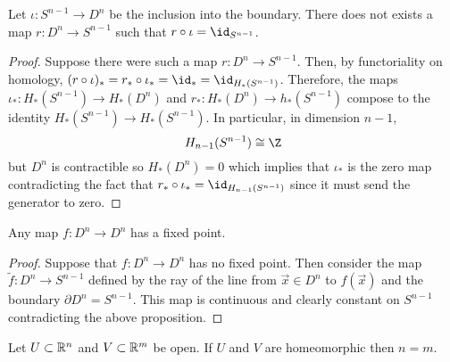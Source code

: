 \documentclass[12pt]{extarticle}
\begin{document}
\begin{proposition}
Let $\iota : S^{n-1} \to D^n$ be the inclusion into the boundary. There does not exists a map $r : D^n \to S^{n-1}$ such that $r \circ \iota = \id_{S^{n-1}}$. 
\end{proposition}

\begin{proof}
Suppose there were such a map $r : D^n \to S^{n-1}$. Then, by functoriality on homology, $(r \circ \iota)_* = r_* \circ \iota_* = \id_* = \id_{H_*(S^{n-1})}$. 
Therefore, the maps $\iota_* : H_*(S^{n-1}) \to H_*(D^n)$ and $r_* : H_*(D^{n}) \to h_*(S^{n-1})$ compose to the identity $H_*(S^{n-1}) \to H_*(S^{n-1})$. In particular, in dimension $n - 1$,
\[ H_{n-1}(S^{n-1}) \cong \Z \]
but $D^n$ is contractible so $H_*(D^n) = 0$ which implies that $\iota_*$ is the zero map contradicting the fact that $r_* \circ \iota_* = \id_{H_{n-1}(S^{n-1})}$ since it must send the generator to zero. 
\end{proof}


\begin{theorem*}[Brower]
Any map $f : D^n \to D^n$ has a fixed point.
\end{theorem*}

\begin{proof}
Suppose that $f : D^n \to D^n$ has no fixed point. Then consider the map $\tilde{f} : D^n \to S^{n-1}$ defined by the ray of the line from $\vec{x} \in D^n$ to $f(\vec{x})$ and the boundary $\partial D^n = S^{n-1}$. This map is continuous and clearly constant on $S^{n-1}$ contradicting the above proposition.
\end{proof}

\begin{proposition}
Let $U \subset \mathbb{R}^n$ and $V \subset \mathbb{R}^m$ be open. If $U$ and $V$ are homeomorphic then $n = m$. 
\end{proposition}
\end{document}

